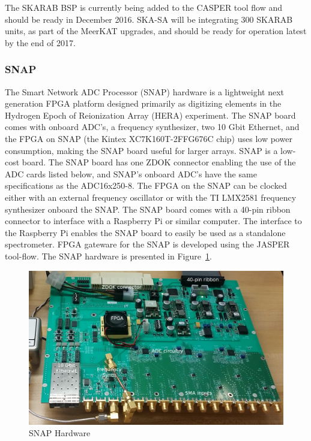 \documentclass{ws-jai}
\begin{document}
The SKARAB BSP is currently being added to the CASPER tool flow and should be ready in December 2016.
SKA-SA will be integrating 300 SKARAB units, as part of the MeerKAT upgrades, and should be ready for operation latest by the end of 2017.


\subsubsection{SNAP}

The Smart Network ADC Processor (SNAP) hardware is a lightweight next generation
FPGA platform designed primarily as digitizing elements in the Hydrogen Epoch of
Reionization Array (HERA) experiment. The SNAP board comes with onboard ADC's, a
frequency synthesizer, two 10 Gbit Ethernet, and the FPGA on SNAP (the Kintex
XC7K160T-2FFG676C chip) uses low power consumption, making the SNAP board useful
for larger arrays. SNAP is a low-cost board. The SNAP board has one ZDOK
connector enabling the use of the ADC cards listed below, and SNAP's onboard
ADC's have the same specifications as the ADC16x250-8. The FPGA on the SNAP can
be clocked either with an external frequency oscillator or with the TI LMX2581
frequency synthesizer onboard the SNAP. The SNAP board comes with a 40-pin
ribbon connector to interface with a  Raspberry Pi or similar computer. The
interface to the Raspberry Pi enables the SNAP board to easily be used as a
standalone spectrometer. FPGA gateware for the SNAP is developed using the
JASPER tool-flow. The SNAP hardware is presented in Figure~\ref{fig:snap_hw}.

\begin{figure}[h]
\centering
\includegraphics[width=150mm, scale=0.5]{snap_hw}
\caption{SNAP Hardware}
\label{fig:snap_hw}
\end{figure}
\end{document}
